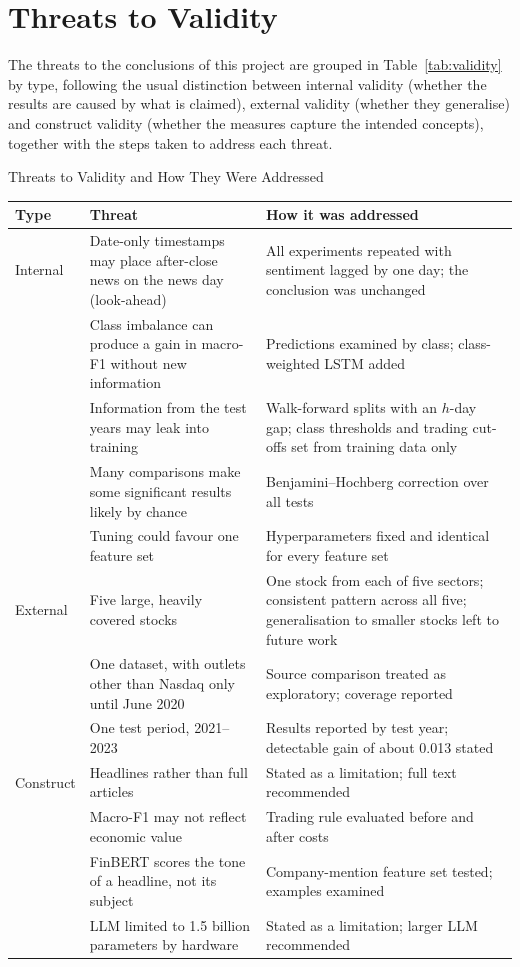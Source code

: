 \section{Threats to Validity}
\label{sec:validity}
The threats to the conclusions of this project are grouped in Table~\ref{tab:validity} by type, following the usual distinction between internal validity (whether the results are caused by what is claimed), external validity (whether they generalise) and construct validity (whether the measures capture the intended concepts), together with the steps taken to address each threat.

\begin{utptable}{Threats to Validity and How They Were Addressed}
\label{tab:validity}
\begin{tabular}{@{}p{1.9cm}p{5.6cm}p{5.6cm}@{}}
\toprule
\textbf{Type} & \textbf{Threat} & \textbf{How it was addressed} \\
\midrule
Internal & Date-only timestamps may place after-close news on the news day (look-ahead) & All experiments repeated with sentiment lagged by one day; the conclusion was unchanged \\
 & Class imbalance can produce a gain in macro-F1 without new information & Predictions examined by class; class-weighted LSTM added \\
 & Information from the test years may leak into training & Walk-forward splits with an $h$-day gap; class thresholds and trading cut-offs set from training data only \\
 & Many comparisons make some significant results likely by chance & Benjamini--Hochberg correction over all tests \\
 & Tuning could favour one feature set & Hyperparameters fixed and identical for every feature set \\
\midrule
External & Five large, heavily covered stocks & One stock from each of five sectors; consistent pattern across all five; generalisation to smaller stocks left to future work \\
 & One dataset, with outlets other than Nasdaq only until June 2020 & Source comparison treated as exploratory; coverage reported \\
 & One test period, 2021--2023 & Results reported by test year; detectable gain of about 0.013 stated \\
\midrule
Construct & Headlines rather than full articles & Stated as a limitation; full text recommended \\
 & Macro-F1 may not reflect economic value & Trading rule evaluated before and after costs \\
 & FinBERT scores the tone of a headline, not its subject & Company-mention feature set tested; examples examined \\
 & LLM limited to 1.5 billion parameters by hardware & Stated as a limitation; larger LLM recommended \\
\bottomrule
\end{tabular}
\end{utptable}
